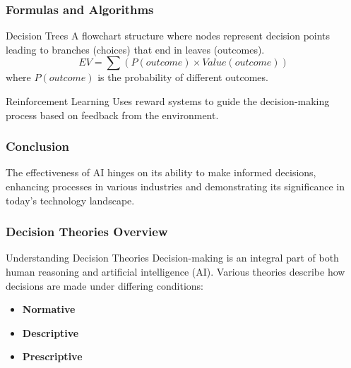 \documentclass[aspectratio=169]{beamer}
\begin{document}
\begin{frame}[fragile]
    \frametitle{Formulas and Algorithms}
    \begin{block}{Decision Trees}
        A flowchart structure where nodes represent decision points leading to branches (choices) that end in leaves (outcomes).
        \begin{equation}
            EV = \sum (P(outcome) \times Value(outcome))
        \end{equation}
        where \( P(outcome) \) is the probability of different outcomes.
    \end{block}
    \begin{block}{Reinforcement Learning}
        Uses reward systems to guide the decision-making process based on feedback from the environment.
    \end{block}
\end{frame}

\begin{frame}[fragile]
    \frametitle{Conclusion}
    The effectiveness of AI hinges on its ability to make informed decisions, enhancing processes in various industries and demonstrating its significance in today's technology landscape.
\end{frame}

\begin{frame}[fragile]
    \frametitle{Decision Theories Overview}
    \begin{block}{Understanding Decision Theories}
        Decision-making is an integral part of both human reasoning and artificial intelligence (AI). Various theories describe how decisions are made under differing conditions:
        \begin{itemize}
            \item \textbf{Normative}
            \item \textbf{Descriptive}
            \item \textbf{Prescriptive}
        \end{itemize}
    \end{block}
\end{frame}
\end{document}
